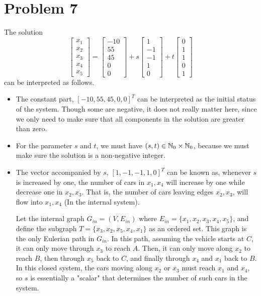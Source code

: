 \documentclass[12pt,a4paper]{article}
\begin{document}
\section*{Problem 7}
\begin{solution}
The solution 
\[
\begin{bmatrix}
x_1 \\
x_2 \\
x_3 \\
x_4 \\
x_5
\end{bmatrix}
=
\begin{bmatrix}
-10 \\
55 \\
45 \\
0 \\
0
\end{bmatrix}
+
s \begin{bmatrix}
1 \\
-1 \\
-1 \\
1 \\
0
\end{bmatrix}
+
t \begin{bmatrix}
0 \\
1 \\
1 \\
0 \\
1
\end{bmatrix}
\]
can be interpreted as follows.
\begin{itemize}
    \item The constant part, $[-10,55, 45,0,0]^T$ can be interpreted as the initial status of the system. Though some are negative, it does not really matter here, since we only need to make sure that all components in the solution are greater than zero. 
    \item For the parameter $s$ and $t$, we must have $(s,t)\in \mathbb{N}_0 \times \mathbb{N}_0$, because we must make sure the solution is a non-negative integer.
    \item The vector accompanied by $s$, $[1,-1,-1,1,0]^T$ can be known as, whenever $s$ is increased by one, the number of cars in $x_1,x_4$ will increase by one while decrease one in $x_2,x_3$. That is, the number of cars leaving edges $x_2,x_3$, will flow into $x_1,x_4$ (In the internal system).
 \begin{remark}
        Let the internal graph $G_{in} = (V, E_{in})$ where $E_{in} = \{x_1, x_2, x_3, x_4, x_5\}$, and define the subgraph $T = \{x_3, x_2, x_5, x_4, x_1\}$ as an ordered set. This graph is the only Eulerian path in $G_{in}$. In this path, assuming the vehicle starts at $C$, it can only move through $x_3$ to reach $A$. Then, it can only move along $x_2$ to reach $B$, then through $x_5$ back to $C$, and finally through $x_4$ and $x_1$ back to $B$. In this closed system, the cars moving along $x_2$ or $x_3$ must reach $x_1$ and $x_4$, so $s$ is essentially a "scalar" that determines the number of such cars in the system.
        

\end{remark}
\end{itemize}
\end{solution}
\end{document}
